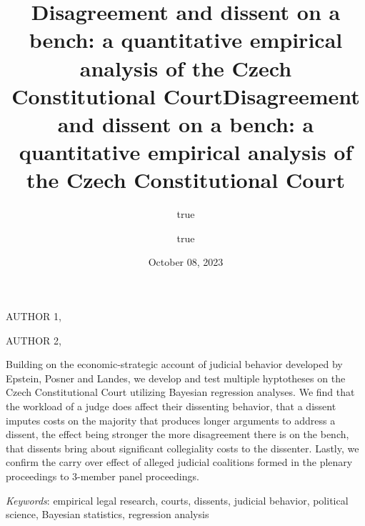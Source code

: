 \documentclass[
  11pt,
]{article}
\title{Disagreement and dissent on a bench: a quantitative empirical
analysis of the Czech Constitutional Court}
\author{true \and true}
\date{October 08, 2023}
\title{Disagreement and dissent on a bench: a quantitative empirical
analysis of the Czech Constitutional Court }
\date{}
\renewenvironment{abstract}
 {{%
    \setlength{\leftmargin}{0mm}
    \setlength{\rightmargin}{\leftmargin}%
  }%
  \relax}
 {\endlist}
\begin{document}



{%
\setlength{\parindent}{0pt}
\thispagestyle{plain}
{%
\maketitle  %

}




{
   \vskip 13.5pt\relax \normalsize\fontsize{11}{12}
   \MakeUppercase{Author
1}, \small{}   \par \vskip -3.5pt \MakeUppercase{Author 2}, \small{}   

}

}








\begin{abstract}


    \vskip 8.5pt %

\noindent \small{Building on the economic-strategic account of judicial
behavior developed by Epstein, Posner and Landes, we develop and test
multiple hyptotheses on the Czech Constitutional Court utilizing
Bayesian regression analyses. We find that the workload of a judge does
affect their dissenting behavior, that a dissent imputes costs on the
majority that produces longer arguments to address a dissent, the effect
being stronger the more disagreement there is on the bench, that
dissents bring about significant collegiality costs to the dissenter.
Lastly, we confirm the carry over effect of alleged judicial coalitions
formed in the plenary proceedings to 3-member panel proceedings.}


\vskip 8.5pt \noindent \emph{Keywords}: empirical legal research,
courts, dissents, judicial behavior, political science, Bayesian
statistics, regression analysis \par




\end{abstract}
\end{document}
